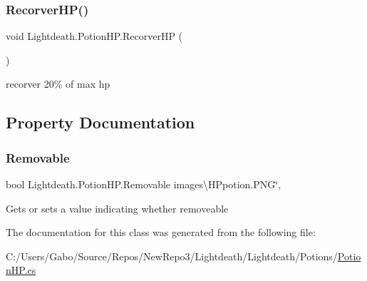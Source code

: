 \subsubsection{\texorpdfstring{Recorver\+H\+P()}{RecorverHP()}}
{\footnotesize\ttfamily void Lightdeath.\+Potion\+H\+P.\+Recorver\+HP (\begin{DoxyParamCaption}{ }\end{DoxyParamCaption})\hspace{0.3cm}{\ttfamily [inline]}}



recorver 20\% of max hp 



\subsection{Property Documentation}
\hypertarget{class_lightdeath_1_1_potion_h_p_acd0030fe46b32286c305c918d15dcb7e}{}\label{class_lightdeath_1_1_potion_h_p_acd0030fe46b32286c305c918d15dcb7e} 
\subsubsection{\texorpdfstring{Removable}{Removable}}
{\footnotesize\ttfamily bool Lightdeath.\+Potion\+H\+P.\+Removable images\textbackslash{}\+H\+Ppotion.\+P\+NG\char`\"{}\hspace{0.3cm}{\ttfamily [get]}, {\ttfamily [set]}}



Gets or sets a value indicating whether removeable 



The documentation for this class was generated from the following file\+:\begin{DoxyCompactItemize}
\item 
C\+:/\+Users/\+Gabo/\+Source/\+Repos/\+New\+Repo3/\+Lightdeath/\+Lightdeath/\+Potions/\hyperlink{_potion_h_p_8cs}{Potion\+H\+P.\+cs}\end{DoxyCompactItemize}
